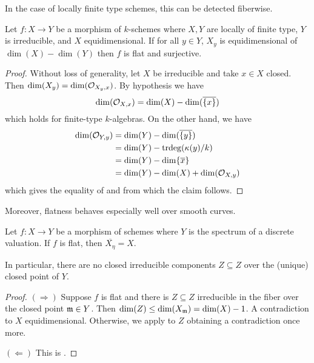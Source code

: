 In the case of locally finite type schemes, this can be detected fiberwise. 
\begin{corollary}\label{corr: fiberwise flatness}
    Let $f:X\to Y$ be a morphism of $k$-schemes where $X,Y$ are locally of finite type, $Y$ is irreducible, and $X$ equidimensional. If for all $y\in Y$, $X_{y}$ is equidimensional of $\dim(X)-\dim(Y)$ then $f$ is flat and surjective. 
\end{corollary}
\begin{proof}
    Without loss of generality, let $X$ be irreducible and take $x\in X$ closed. Then $\dim(X_{y})=\dim(\mathcal{O}_{X_{y},x})$. By hypothesis we have 
    $$\dim(\mathcal{O}_{X,x})=\dim(X)-\dim(\overline{\{x\}})$$
    which holds for finite-type $k$-algebras. On the other hand, we have 
    \begin{align*}
        \dim(\mathcal{O}_{Y,y}) &= \dim(Y)-\dim(\overline{\{y\}}) \\
        &= \dim(Y)-\mathrm{trdeg}(\kappa(y)/k) \\
        &= \dim(Y)-\dim\{\overline{x}\} \\
        &= \dim(Y)-\dim(X)+\dim(\mathcal{O}_{X,y})
    \end{align*}
    which gives the equality of  and from which the claim follows. 
\end{proof}
Moreover, flatness behaves especially well over smooth curves. 
\begin{proposition}\label{prop: flatness over curves}
    Let $f:X\to Y$ be a morphism of schemes where $Y$ is the spectrum of a discrete valuation. If $f$ is flat, then $\overline{X_{\eta}}=X$. 
\end{proposition}
In particular, there are no closed irreducible components $Z\subseteq Z$ over the (unique) closed point of $Y$. 
\begin{proof}
    $(\Rightarrow)$ Suppose $f$ is flat and there is $Z\subseteq Z$ irreducible in the fiber over the closed point $\mathfrak{m}\in Y$. Then $\dim(Z)\leq \dim(X_{\mathfrak{m}})=\dim(X)-1$. A contradiction to $X$ equidimensional. Otherwise, we apply  to $Z$ obtaining a contradiction once more. 

    $(\Leftarrow)$ This is \cite[Prop III.9.7]{Hartshorne}.
\end{proof}